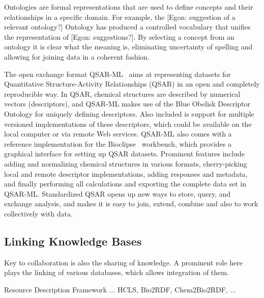\documentclass[12pt]{book}
\begin{document}
Ontologies are formal representations that are used to define concepts and their relationships in a specific domain. For example, the [Egon: suggestion of a relevant ontology?] Ontology has produced a controlled vocabulary that unifies the representation of [Egon: suggestions?]. By selecting a concept from an ontology it is clear what the meaning is, eliminating uncertainty of spelling and allowing for joining data in a coherent fashion.

The open exchange format QSAR-ML~\cite{Spjuth:2010fk} aims at representing datasets for Quantitative Structure-Activity Relationships (QSAR) in an open and completely reproducible way. In QSAR, chemical structures are described by numerical vectors (descriptors), and QSAR-ML makes use of the Blue Obelisk Descriptor Ontology for uniquely defining descriptors. Also included is support for multiple versioned implementations of these descriptors, which could be available on the local computer or via remote Web services. QSAR-ML also comes with a reference implementation for the Bioclipse~\cite{Spjuth2009,Spjuth2007} workbench, which provides a graphical interface for setting up QSAR datasets. Prominent features include adding and normalizing chemical structures in various formats, cherry-picking local and remote descriptor implementations, adding responses and metadata, and finally performing all calculations and exporting the complete data set in QSAR-ML. Standardized QSAR opens up new ways to store, query, and exchange analysis, and makes it is easy to join, extend, combine and also to work collectively with data.



\subsection{Linking Knowledge Bases}

Key to collaboration is also the sharing of knowledge. A prominent role here
plays the linking of various databases, which allows integration of them.

Resource Description Framework ... HCLS, Bio2RDF, Chem2Bio2RDF, ...
\end{document}
